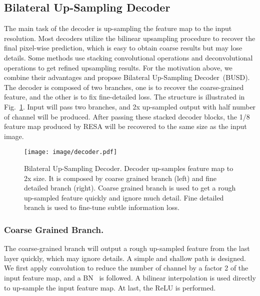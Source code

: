 \documentclass[letterpaper]{article} \usepackage{aaai21}  \usepackage{times}  \usepackage{helvet} \usepackage{courier}  \usepackage[hyphens]{url}  \usepackage{graphicx} \urlstyle{rm} \def\UrlFont{\rm}  \usepackage{natbib}  \usepackage{caption} \frenchspacing  \setlength{\pdfpagewidth}{8.5in}  \setlength{\pdfpageheight}{11in}  \usepackage{amsmath}
\begin{document}
\subsection{Bilateral Up-Sampling Decoder}
The main task of the decoder is up-sampling the feature map to the input resolution. Most decoders utilize the bilinear upsampling procedure to recover the final pixel-wise prediction, which is easy to obtain coarse results but may lose details. Some methods \citep{romera2017erfnet} use stacking convolutional operations and deconvolutional operations to get refined upsampling results. For the motivation above, we combine their advantages and propose Bilateral Up-Sampling Decoder~(BUSD). The decoder is composed of two branches, one is to recover the coarse-grained feature, and the other is to fix fine-detailed loss. The structure is illustrated in Fig.~\ref{decoder}. Input will pass two branches, and 2x up-sampled output with half number of channel will be produced. After passing these stacked decoder blocks, the 1/8 feature map produced by RESA will be recovered to the same size as the input image.

\begin{figure}[!t]
\centering
\texttt{[image: image/decoder.pdf]}
\caption{Bilateral Up-Sampling Decoder. Decoder up-samples feature map to 2x size. It is composed by coarse grained branch (left) and fine detailed branch (right). Coarse grained branch is used to get a rough up-sampled feature quickly and ignore much detail. Fine detailed branch is used to fine-tune subtle information loss.}
\label{decoder}
\vspace{-12pt}
\end{figure}

\begin{table*}[]
\centering
{}
\caption{Datasets description.}
\label{datasets}
\end{table*}

\subsubsection{Coarse Grained Branch.}
The coarse-grained branch will output a rough up-sampled feature from the last layer quickly, which may ignore details. A simple and shallow path is designed. We first apply  convolution to reduce the number of channel by a factor 2 of the input feature map, and a BN~\cite{ioffe2015batch} is followed. A bilinear interpolation is used directly to up-sample the input feature map. At last, the ReLU is performed.
\end{document}

